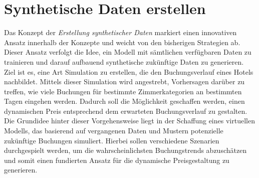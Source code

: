 \section{Synthetische Daten erstellen}
\label{sec:Synthetische}
Das Konzept der \emph{Erstellung synthetischer Daten} markiert einen innovativen Ansatz innerhalb der Konzepte und weicht von den bisherigen Strategien ab. Dieser Ansatz verfolgt die Idee, ein Modell mit sämtlichen verfügbaren Daten zu trainieren und darauf aufbauend synthetische zukünftige Daten zu generieren. Ziel ist es, eine Art Simulation zu erstellen, die den Buchungsverlauf eines Hotels nachbildet.
\newline
\newline
Mittels dieser Simulation wird angestrebt, Vorhersagen darüber zu treffen, wie viele Buchungen für bestimmte Zimmerkategorien an bestimmten Tagen eingehen werden. Dadurch soll die Möglichkeit geschaffen werden, einen dynamischen Preis entsprechend dem erwarteten Buchungsverlauf zu gestalten.
\newline
\newline
Die Grundidee hinter dieser Vorgehensweise liegt in der Schaffung eines virtuellen Modells, das basierend auf vergangenen Daten und Mustern potenzielle zukünftige Buchungen simuliert. Hierbei sollen verschiedene Szenarien durchgespielt werden, um die wahrscheinlichsten Buchungstrends abzuschätzen und somit einen fundierten Ansatz für die dynamische Preisgestaltung zu generieren.